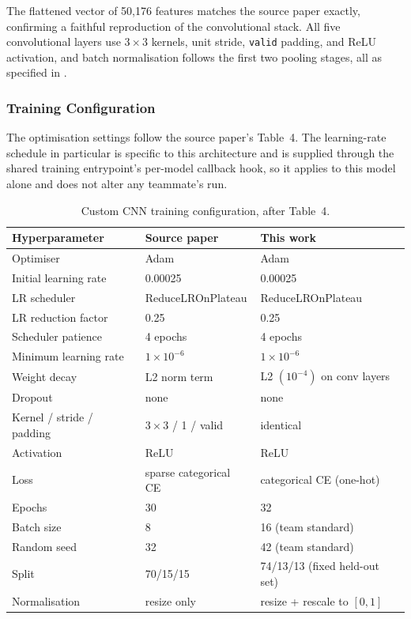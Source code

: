 \documentclass[11pt,twoside,a4paper]{article}
\begin{document}
The flattened vector of 50,176 features matches the source paper exactly,
confirming a faithful reproduction of the convolutional stack. All five
convolutional layers use $3\times3$ kernels, unit stride, \texttt{valid}
padding, and ReLU activation, and batch normalisation follows the first two
pooling stages, all as specified in \cite{Abdelmonem2026}.

\subsubsection{Training Configuration}

The optimisation settings follow the source paper's Table~4. The learning-rate
schedule in particular is specific to this architecture and is supplied through
the shared training entrypoint's per-model callback hook, so it applies to this
model alone and does not alter any teammate's run.

\begin{table}[H]
\centering
\caption{Custom CNN training configuration, after \cite{Abdelmonem2026} Table~4.}
\label{tab:customcnn-config}
\small
\begin{tabular}{lll}
\toprule
Hyperparameter & Source paper & This work \\
\midrule
Optimiser & Adam & Adam \\
Initial learning rate & 0.00025 & 0.00025 \\
LR scheduler & ReduceLROnPlateau & ReduceLROnPlateau \\
LR reduction factor & 0.25 & 0.25 \\
Scheduler patience & 4 epochs & 4 epochs \\
Minimum learning rate & $1 \times 10^{-6}$ & $1 \times 10^{-6}$ \\
Weight decay & L2 norm term & L2 $(10^{-4})$ on conv layers \\
Dropout & none & none \\
Kernel / stride / padding & $3\times3$ / 1 / valid & identical \\
Activation & ReLU & ReLU \\
Loss & sparse categorical CE & categorical CE (one-hot) \\
Epochs & 30 & 32 \\
Batch size & 8 & 16 (team standard) \\
Random seed & 32 & 42 (team standard) \\
Split & 70/15/15 & 74/13/13 (fixed held-out set) \\
Normalisation & resize only & resize + rescale to $[0,1]$ \\
\bottomrule
\end{tabular}
\end{table}
\end{document}
